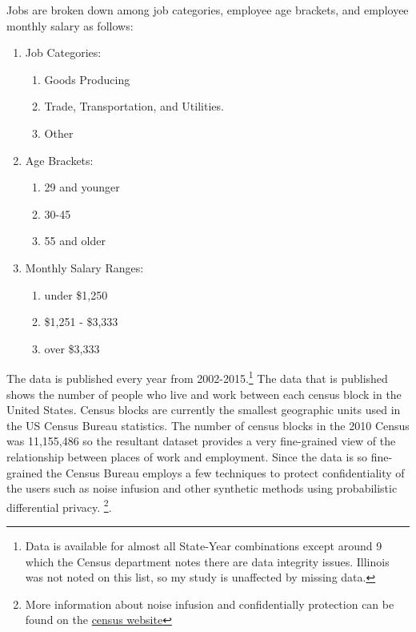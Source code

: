\documentclass{article}
\newcommand\fnurl[2]{%
\href{#2}{#1}%
}
\begin{document}
Jobs are broken down among job categories, employee age brackets, and employee monthly salary as follows:
\begin{enumerate}
\item Job Categories:
    \begin{enumerate}
        \item Goods Producing
        \item Trade, Transportation, and Utilities.
        \item Other
    \end{enumerate}
\item Age Brackets:
    \begin{enumerate}
        \item 29 and younger
        \item 30-45
        \item 55 and older
    \end{enumerate}
\item Monthly Salary Ranges:
    \begin{enumerate}
        \item under \$1,250
        \item \$1,251 - \$3,333
        \item over \$3,333
    \end{enumerate}
\end{enumerate}

The data is published every year from 2002-2015.\footnote{Data is available for almost all State-Year combinations except around 9 which the Census department notes there are data integrity issues.  Illinois was not noted on this list, so my study is unaffected by missing data.}  The data that is published shows the number of people who live and work between each census block in the United States.  Census blocks are currently the smallest geographic units used in the US Census Bureau statistics.  The number of census blocks in the 2010 Census was 11,155,486 so the resultant dataset provides a very fine-grained view of the relationship between places of work and employment.  Since the data is so fine-grained the Census Bureau employs a few techniques to protect confidentiality of the users such as noise infusion and other synthetic methods using probabilistic differential privacy. \footnote{More information about noise infusion and confidentially protection can be found on the \fnurl{census website}{https://www2.census.gov/ces/wp/2014/CES-WP-14-30.pdf}}.\\
\end{document}
